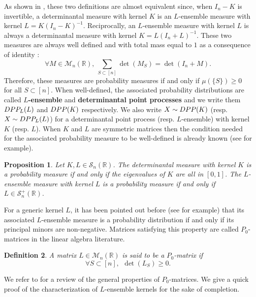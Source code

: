 \documentclass{article}
\numberwithin{equation}{section}
\renewcommand{\geq}{\geqslant}
\newcommand{\bR}{\mathbb{R}}
\newcommand{\DPP}{\textnormal{DPP}}
\theoremstyle{plain}
\newtheorem{proposition}{Proposition}[section]
\newtheorem{definition}[proposition]{Definition}
\begin{document}
\noindent As shown in \cite{Taskar}, these two definitions are almost equivalent since, when $I_n-K$ is invertible, a determinantal measure with kernel $K$ is an $L$-ensemble measure with kernel $L=K(I_n-K)^{-1}$. Reciprocally, an $L$-ensemble measure with kernel $L$ is always a determinantal measure with kernel $K=L(I_n+L)^{-1}$. These two measures are always well defined and with total mass equal to $1$ as a consequence of identity \cite[1.2.P20]{Horn}:
\begin{equation}\label{eq: Sum_minors}
\forall M\in\mathcal{M}_n(\bR),~\sum_{S\subset [n]}\det(M_S) = \det(I_n+M).
\end{equation}
Therefore, these measures are probability measures if and only if $\mu(\{S\})\geq 0$ for all $S\subset [n]$. When well-defined, the associated probability distributions are called \textbf{$L$-ensemble} and \textbf{determinantal point processes} and we write them $\DPP_L(L)$ and $\DPP(K)$ respectively. We also write $X\sim \DPP(K)$ (resp. $X\sim \DPP_L(L)$) for a determinantal point process (resp. $L$-ensemble) with kernel $K$ (resp. $L$). When $K$ and $L$ are symmetric matrices then the condition needed for the associated probability measure to be well-defined is already known (see \cite{Taskar} for example).

\begin{proposition}
Let $K,L\in\mathcal{S}_n(\bR)$. The determinantal measure with kernel $K$ is a probability measure if and only if the eigenvalues of $K$ are all in $[0, 1]$. The $L$-ensemble measure with kernel $L$ is a probability measure if and only if $L\in\mathcal{S}_n^+(\bR)$.
\end{proposition}

\noindent For a generic kernel $L$, it has been pointed out before (see \cite{Brunel18, Han} for example) that its associated $L$-ensemble measure is a probability distribution if and only if its principal minors are non-negative. Matrices satisfying this property are called $P_0$-matrices in the linear algebra literature.

\begin{definition}
A matrix $L\in\mathcal{M}_n(\bR)$ is said to be a $P_0$-matrix if
\[\forall S\subset [n],~~\det(L_S)\geq 0.\]
\end{definition}

\noindent We refer to \cite[Chapter 4]{Johnson20} for a review of the general properties of $P_0$-matrices. We give a quick proof of the characterization of $L$-ensemble kernels for the sake of completion.
\end{document}

